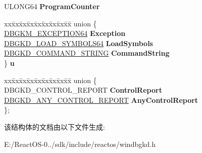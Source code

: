 \begin{DoxyCompactItemize}
U\+L\+O\+N\+G64 {\bfseries Program\+Counter}
\item 
\mbox{\label{struct___d_b_g_k_d___a_n_y___w_a_i_t___s_t_a_t_e___c_h_a_n_g_e_a75a7c845f80c58f8229c2d062a90db3b}} 
\begin{tabbing}
xx\=xx\=xx\=xx\=xx\=xx\=xx\=xx\=xx\=\kill
union \{\\
\>\hyperlink{struct___d_b_g_k_m___e_x_c_e_p_t_i_o_n64}{DBGKM\_EXCEPTION64} {\bfseries Exception}\\
\>\hyperlink{struct___d_b_g_k_d___l_o_a_d___s_y_m_b_o_l_s64}{DBGKD\_LOAD\_SYMBOLS64} {\bfseries LoadSymbols}\\
\>\hyperlink{struct___d_b_g_k_d___c_o_m_m_a_n_d___s_t_r_i_n_g}{DBGKD\_COMMAND\_STRING} {\bfseries CommandString}\\
\} {\bfseries u}\\

\end{tabbing}\item 
\mbox{\label{struct___d_b_g_k_d___a_n_y___w_a_i_t___s_t_a_t_e___c_h_a_n_g_e_a342445a099252346158fcc0954d3d9da}} 
\begin{tabbing}
xx\=xx\=xx\=xx\=xx\=xx\=xx\=xx\=xx\=\kill
union \{\\
\>DBGKD\_CONTROL\_REPORT {\bfseries ControlReport}\\
\>\hyperlink{struct___d_b_g_k_d___a_n_y___c_o_n_t_r_o_l___r_e_p_o_r_t}{DBGKD\_ANY\_CONTROL\_REPORT} {\bfseries AnyControlReport}\\
\}; \\

\end{tabbing}\end{DoxyCompactItemize}


该结构体的文档由以下文件生成\+:\begin{DoxyCompactItemize}
\item 
E\+:/\+React\+O\+S-\/0../sdk/include/reactos/windbgkd.\+h\end{DoxyCompactItemize}
